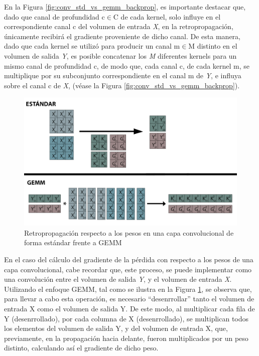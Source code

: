 En la Figura \ref{fig:conv_std_vs_gemm_backprop}, es importante destacar que, dado que canal de profundidad c$\in$C de cada kernel, solo influye en el correspondiente canal c del volumen de entrada \textit{X}, en la retropropagación, únicamente recibirá el gradiente proveniente de dicho canal. De esta manera, dado que cada kernel se utilizó para producir un canal m$\in$M distinto en el volumen de salida \textit{Y}, es posible concatenar los \textit{M} diferentes kernels para un mismo canal de profundidad c, de modo que, cada canal c, de cada kernel m, se multiplique por su subconjunto correspondiente en el canal m de \textit{Y}, e influya sobre el canal c de \textit{X}, (véase la Figura \ref{fig:conv_std_vs_gemm_backprop}). 

\begin{figure}[H]
	\includegraphics[scale=0.33]{imagenes/conv_std_vs_gemm_backprop_pesos.jpg}  
	\caption{Retropropagación respecto a los pesos en una capa convolucional de forma estándar frente a GEMM}
	\label{fig:conv_std_vs_gemm_backprop_pesos}
\end{figure}

En el caso del cálculo del gradiente de la pérdida con respecto a los pesos de una capa convolucional, cabe recordar que, este proceso, se puede implementar como una convolución entre el volumen de salida \textit{Y}, y el volumen de entrada \textit{X}. Utilizando el enfoque GEMM, tal como se ilustra en la Figura \ref{fig:conv_std_vs_gemm_backprop_pesos}, se observa que, para llevar a cabo esta operación, es necesario ``desenrrollar'' tanto el volumen de entrada X como el volumen de salida Y. De este modo, al multiplicar cada fila de Y (desenrrollado), por cada columna de X (desenrrollado), se multiplican todos los elementos del volumen de salida Y, y del volumen de entrada X, que, previamente, en la propagación hacia delante, fueron multiplicados por un peso distinto, calculando así el gradiente de dicho peso.

